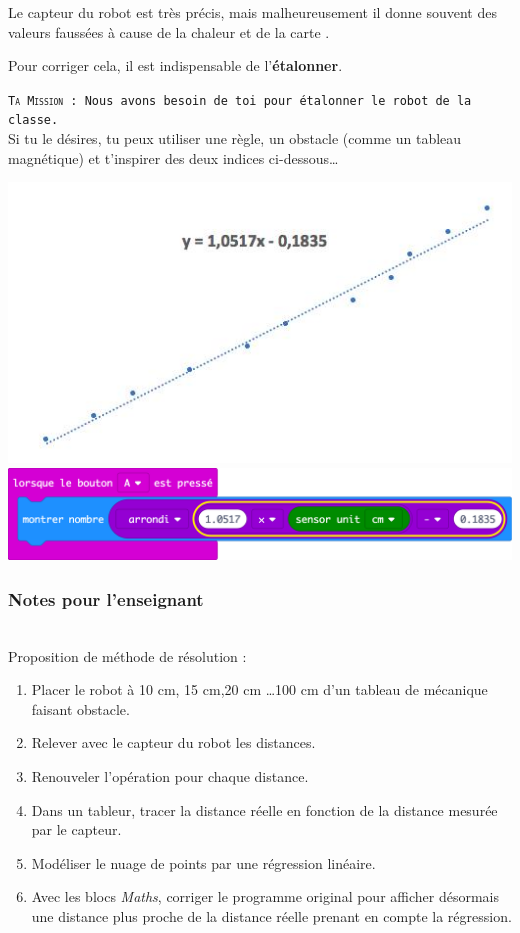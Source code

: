 \begin{eleve}

    Le capteur du robot \mq est très précis, mais malheureusement il donne souvent des valeurs faussées à cause de la chaleur et de la carte \mb.
    
    Pour corriger cela, il est indispensable de l'\textbf{étalonner}.
    
   
    \texttt{\textsc{Ta Mission} : Nous avons besoin de toi pour étalonner le robot \mq de la classe.
    }~\\
    
    Si tu le désires, tu peux utiliser une règle, un obstacle (comme un tableau magnétique) et t'inspirer des deux indices ci-dessous\ldots
    
    \includegraphics[width=0.25\linewidth]{res/maqueen-fiche1-20.jpg}
    \hfill
    \includegraphics[width=0.45\linewidth]{res/maqueen-fiche1-21.png}
\end{eleve}



\subsubsection{Notes pour l'enseignant}

\begin{methode}~\\

Proposition de méthode de résolution :

\begin{enumerate}
    \item Placer le robot à 10 cm, 15 cm,20 cm \ldots 100 cm d’un tableau de mécanique faisant obstacle.
    \item Relever avec le capteur du robot les distances.
    \item Renouveler l’opération pour chaque distance.
    \item Dans un tableur, tracer la distance réelle en fonction de la distance mesurée par le capteur.
    \item Modéliser le nuage de points par une régression linéaire.
    \item Avec les blocs \textit{Maths}, corriger le programme original pour afficher désormais une distance plus proche de la distance réelle prenant en compte la régression.
\end{enumerate}
\end{methode}




